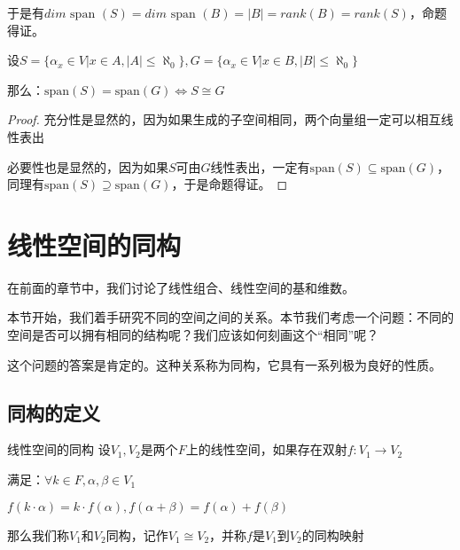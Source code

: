 \documentclass[12pt, a4paper, oneside, UTF8]{ctexbook}
\begin{document}
\begin{para}{0}
\begin{proposition}
						于是有$dim \text{ span }(S)=dim \text{ span }(B)=|B|=rank(B)=rank(S)$，命题得证。
					\end{proposition}
				\point{}
					\begin{proposition}
						设$S=\{\alpha_x \in V| x \in A,|A| \leqslant \aleph_0\},G=\{\alpha_x \in V| x \in B,|B| \leqslant \aleph_0\}$

						那么：$\text{span}(S)=\text{span}(G) \Leftrightarrow S \cong G$
					\end{proposition}
					\begin{proof}
						充分性是显然的，因为如果生成的子空间相同，两个向量组一定可以相互线性表出

						必要性也是显然的，因为如果$S$可由$G$线性表出，一定有$\text{span}(S)\subseteq\text{span}(G)$，同理有$\text{span}(S)\supseteq\text{span}(G)$，于是命题得证。
					\end{proof}
			\end{para}
	\section{线性空间的同构}
		在前面的章节中，我们讨论了线性组合、线性空间的基和维数。

		本节开始，我们着手研究不同的空间之间的关系。本节我们考虑一个问题：不同的空间是否可以拥有相同的结构呢？我们应该如何刻画这个“相同”呢？

		这个问题的答案是肯定的。这种关系称为同构，它具有一系列极为良好的性质。
		\subsection{同构的定义}
			\begin{defn}{线性空间的同构}
				设$V_1,V_2$是两个$F$上的线性空间，如果存在双射$f:V_1 \rightarrow V_2$

				满足：$\forall k \in F,\alpha ,\beta \in V_1$

				$f(k\cdot\alpha )=k\cdot f(\alpha ),f(\alpha+\beta )=f(\alpha )+f(\beta )$

				那么我们称$V_1$和$V_2$同构，记作$V_1 \cong V_2$，并称$f$是$V_1$到$V_2$的同构映射
			\end{defn}
\end{document}
